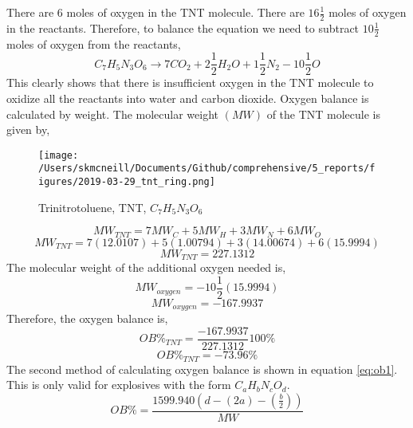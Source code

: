 There are $6$ moles of oxygen in the TNT molecule.  There are $16\frac{1}{2}$ moles of oxygen in the reactants.  Therefore, to balance the equation we need to subtract $10\frac{1}{2}$ moles of oxygen from the reactants,
\begin{equation}\label{eq:tnt_3}
C_7H_5N_3O_6 \rightarrow 7CO_2+2\frac{1}{2}H_2O+1\frac{1}{2}N_2-10\frac{1}{2}O
\end{equation}
This clearly shows that there is insufficient oxygen in the TNT molecule to oxidize all the reactants into water and carbon dioxide.  Oxygen balance is calculated by weight.  The molecular weight $(MW)$ of the TNT molecule is given by,
\begin{figure}
  \begin{center}
   \texttt{[image: /Users/skmcneill/Documents/Github/comprehensive/5\_reports/figures/2019-03-29\_tnt\_ring.png]}
  \end{center}
  \caption{Trinitrotoluene, TNT, $C_7H_5N_3O_6$}
\label{fig:tnt}
\end{figure}%
\begin{equation}\label{eq:tnt_mw1}
MW_{TNT} = 7MW_{C}+5MW_{H}+3MW_{N}+6MW_{O}
\end{equation}
\begin{equation}\label{eq:tnt_mw2}
MW_{TNT} = 7(12.0107)+5(1.00794)+3(14.00674)+6(15.9994)
\end{equation}
\begin{equation}\label{eq:tnt_mw3}
MW_{TNT} = 227.1312
\end{equation}
The molecular weight of the additional oxygen needed is,
\begin{equation}\label{eq:tnt_mw4}
MW_{oxygen} = -10\frac{1}{2}(15.9994)
\end{equation}
\begin{equation}\label{eq:tnt_mw5}
MW_{oxygen} = -167.9937
\end{equation}
Therefore, the oxygen balance is,
\begin{equation}\label{eq:tnt_ob1}
OB\%_{TNT} = \frac{-167.9937}{227.1312}100\%
\end{equation}
\begin{equation}\label{eq:tnt_ob2}
OB\%_{TNT} = -73.96\%
\end{equation}
The second method of calculating oxygen balance is shown in equation \ref{eq:ob1}.  This is only valid for explosives with the form $C_aH_bN_cO_d$.
\begin{equation}\label{eq:ob1}
OB\% = \frac{1599.940\left(d-\left(2a\right)-\left(\frac{b}{2}\right)\right)}{MW}
\end{equation}
